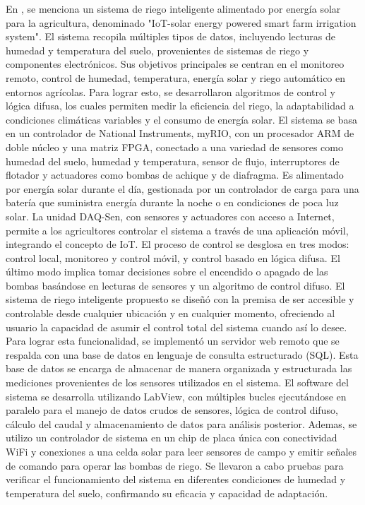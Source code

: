 \bigbreak
En \cite{al-ali_iot-solar_2019}, se menciona un sistema de riego inteligente alimentado por energía solar para la agricultura, denominado "IoT-solar energy powered smart farm irrigation system". El sistema recopila múltiples tipos de datos, incluyendo lecturas de humedad y temperatura del suelo, provenientes de sistemas de riego y componentes electrónicos. Sus objetivos principales se centran en el monitoreo remoto, control de humedad, temperatura, energía solar y riego automático en entornos agrícolas. Para lograr esto, se desarrollaron algoritmos de control y lógica difusa, los cuales permiten medir la eficiencia del riego, la adaptabilidad a condiciones climáticas variables y el consumo de energía solar. El sistema se basa en un controlador de National Instruments, myRIO, con un procesador ARM de doble núcleo y una matriz FPGA, conectado a una variedad de sensores como humedad del suelo, humedad y temperatura, sensor de flujo, interruptores de flotador y actuadores como bombas de achique y de diafragma. Es alimentado por energía solar durante el día, gestionada por un controlador de carga para una batería que suministra energía durante la noche o en condiciones de poca luz solar. La unidad DAQ-Sen, con sensores y actuadores con acceso a Internet, permite a los agricultores controlar el sistema a través de una aplicación móvil, integrando el concepto de IoT. El proceso de control se desglosa en tres modos: control local, monitoreo y control móvil, y control basado en lógica difusa. El último modo implica tomar decisiones sobre el encendido o apagado de las bombas basándose en lecturas de sensores y un algoritmo de control difuso. El sistema de riego inteligente propuesto se diseñó con la premisa de ser accesible y controlable desde cualquier ubicación y en cualquier momento, ofreciendo al usuario la capacidad de asumir el control total del sistema cuando así lo desee. Para lograr esta funcionalidad, se implementó un servidor web remoto que se respalda con una base de datos en lenguaje de consulta estructurado (SQL). Esta base de datos se encarga de almacenar de manera organizada y estructurada las mediciones provenientes de los sensores utilizados en el sistema.  El software del sistema se desarrolla utilizando LabView, con múltiples bucles ejecutándose en paralelo para el manejo de datos crudos de sensores, lógica de control difuso, cálculo del caudal y almacenamiento de datos para análisis posterior. Ademas, se utilizo un controlador de sistema en un chip de placa única con conectividad WiFi y conexiones a una celda solar para leer sensores de campo y emitir señales de comando para operar las bombas de riego. Se llevaron a cabo pruebas para verificar el funcionamiento del sistema en diferentes condiciones de humedad y temperatura del suelo, confirmando su eficacia y capacidad de adaptación.


